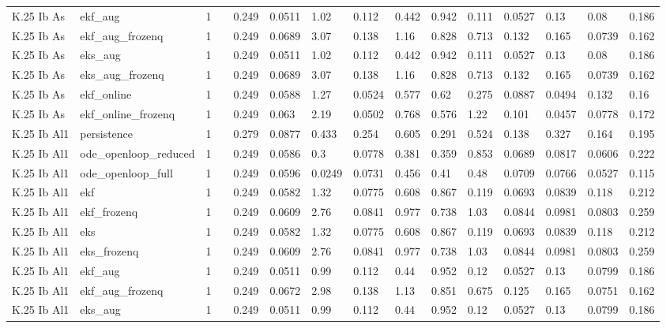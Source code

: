 \begin{table}[t]
\begin{tabular}{lllllllllllllll}
K.25 Ib As & ekf\_aug & 1 &  & 0.249 & 0.0511 & 1.02 & 0.112 & 0.442 & 0.942 & 0.111 & 0.0527 & 0.13 & 0.08 & 0.186 \\
K.25 Ib As & ekf\_aug\_frozenq & 1 &  & 0.249 & 0.0689 & 3.07 & 0.138 & 1.16 & 0.828 & 0.713 & 0.132 & 0.165 & 0.0739 & 0.162 \\
K.25 Ib As & eks\_aug & 1 &  & 0.249 & 0.0511 & 1.02 & 0.112 & 0.442 & 0.942 & 0.111 & 0.0527 & 0.13 & 0.08 & 0.186 \\
K.25 Ib As & eks\_aug\_frozenq & 1 &  & 0.249 & 0.0689 & 3.07 & 0.138 & 1.16 & 0.828 & 0.713 & 0.132 & 0.165 & 0.0739 & 0.162 \\
K.25 Ib As & ekf\_online & 1 &  & 0.249 & 0.0588 & 1.27 & 0.0524 & 0.577 & 0.62 & 0.275 & 0.0887 & 0.0494 & 0.132 & 0.16 \\
K.25 Ib As & ekf\_online\_frozenq & 1 &  & 0.249 & 0.063 & 2.19 & 0.0502 & 0.768 & 0.576 & 1.22 & 0.101 & 0.0457 & 0.0778 & 0.172 \\
K.25 Ib Al1 & persistence & 1 &  & 0.279 & 0.0877 & 0.433 & 0.254 & 0.605 & 0.291 & 0.524 & 0.138 & 0.327 & 0.164 & 0.195 \\
K.25 Ib Al1 & ode\_openloop\_reduced & 1 &  & 0.249 & 0.0586 & 0.3 & 0.0778 & 0.381 & 0.359 & 0.853 & 0.0689 & 0.0817 & 0.0606 & 0.222 \\
K.25 Ib Al1 & ode\_openloop\_full & 1 &  & 0.249 & 0.0596 & 0.0249 & 0.0731 & 0.456 & 0.41 & 0.48 & 0.0709 & 0.0766 & 0.0527 & 0.115 \\
K.25 Ib Al1 & ekf & 1 &  & 0.249 & 0.0582 & 1.32 & 0.0775 & 0.608 & 0.867 & 0.119 & 0.0693 & 0.0839 & 0.118 & 0.212 \\
K.25 Ib Al1 & ekf\_frozenq & 1 &  & 0.249 & 0.0609 & 2.76 & 0.0841 & 0.977 & 0.738 & 1.03 & 0.0844 & 0.0981 & 0.0803 & 0.259 \\
K.25 Ib Al1 & eks & 1 &  & 0.249 & 0.0582 & 1.32 & 0.0775 & 0.608 & 0.867 & 0.119 & 0.0693 & 0.0839 & 0.118 & 0.212 \\
K.25 Ib Al1 & eks\_frozenq & 1 &  & 0.249 & 0.0609 & 2.76 & 0.0841 & 0.977 & 0.738 & 1.03 & 0.0844 & 0.0981 & 0.0803 & 0.259 \\
K.25 Ib Al1 & ekf\_aug & 1 &  & 0.249 & 0.0511 & 0.99 & 0.112 & 0.44 & 0.952 & 0.12 & 0.0527 & 0.13 & 0.0799 & 0.186 \\
K.25 Ib Al1 & ekf\_aug\_frozenq & 1 &  & 0.249 & 0.0672 & 2.98 & 0.138 & 1.13 & 0.851 & 0.675 & 0.125 & 0.165 & 0.0751 & 0.162 \\
K.25 Ib Al1 & eks\_aug & 1 &  & 0.249 & 0.0511 & 0.99 & 0.112 & 0.44 & 0.952 & 0.12 & 0.0527 & 0.13 & 0.0799 & 0.186 \\

\end{tabular}
\end{table}
